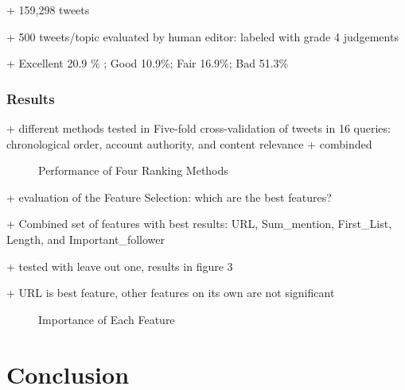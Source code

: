 \documentclass{proseminar}
\begin{document}
+ 159,298 tweets

+ 500 tweets/topic evaluated by human editor: labeled with grade 4 judgements 

+ Excellent 20.9 \% ; Good 10.9\%; Fair 16.9\%; Bad 51.3\% 

\subsubsection*{Results}
+ different methods tested in Five-fold cross-validation of tweets in 16 queries: chronological order, account authority, and content relevance + combinded
\begin{figure}[h]
\centering
{}
\caption{Performance of Four Ranking Methods}
\end{figure}

+ evaluation of the Feature Selection: which are the best features?

+ Combined set of features with best results: URL, Sum\_mention, First\_List, Length, and Important\_follower

+ tested with leave out one, results in figure 3

+ URL is best feature, other features on its own are not significant

\begin{figure}[h]
\centering
{}
\caption{Importance of Each Feature}
\end{figure}




\section{Conclusion}




 

\balancecolumns
\end{document}

